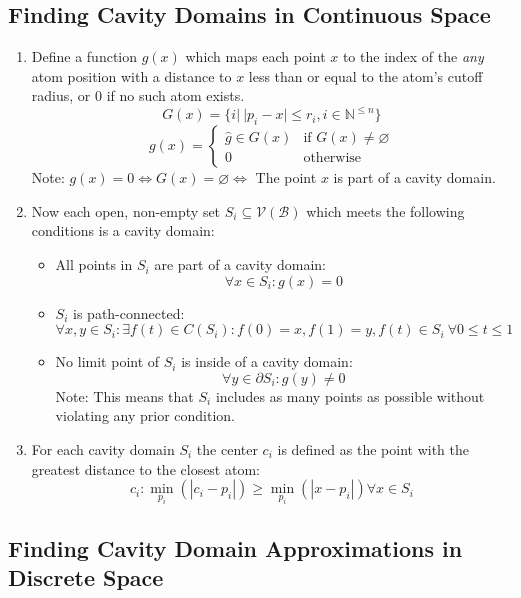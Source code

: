   \subsection{Finding Cavity Domains in Continuous Space}
  \begin{enumerate}
  \item{Define a function $g(x)$ which maps each point $x$ to the index of the \emph{any} atom position with a distance to $x$ less than or equal to the atom's cutoff radius, or 0 if no such atom exists.
  \[G(x) = \{i|~ |p_{i}-x| \le r_i,i \in \mathbb{N}^{\le n}\}\]
  \[g(x) = \left\{\begin{array}{ll}\hat{g} \in G(x)&\text{if } G(x) \ne \varnothing\\0&\text{otherwise}\end{array}\right.\]
  Note: $g(x) = 0 \Leftrightarrow G(x) = \varnothing \Leftrightarrow$ The point $x$ is part of a cavity domain.}
  \item{Now each open, non-empty set $S_i \subseteq \mathcal{V}(\mathcal{B})$ which meets the following conditions is a cavity domain:
  \begin{itemize}
  \item{All points in $S_i$ are part of a cavity domain:
  \[\forall x \in S_i\colon g(x) = 0\]}
  \item{$S_i$ is path-connected:
  \[\forall x, y \in S_i\colon \exists f(t) \in C(S_i)\colon f(0) = x, f(1) = y, f(t) \in S_i ~ \forall 0 \le t \le 1\]}
  \item{No limit point of $S_i$ is inside of a cavity domain:
  \[\forall y \in \partial{S_i}\colon g(y) \ne 0 \]
  Note: This means that $S_i$ includes as many points as possible without violating any prior condition.}
  \end{itemize}}
  \item{For each cavity domain $S_i$ the center $c_i$ is defined as the point with the greatest distance to the closest atom:
  \[c_i\colon \min_{p_i}(|c_i-p_i|) \ge \min_{p_i}(|x-p_i|) \forall x \in S_i\]
  }
  \end{enumerate}



\subsection{Finding Cavity Domain Approximations in Discrete Space}

